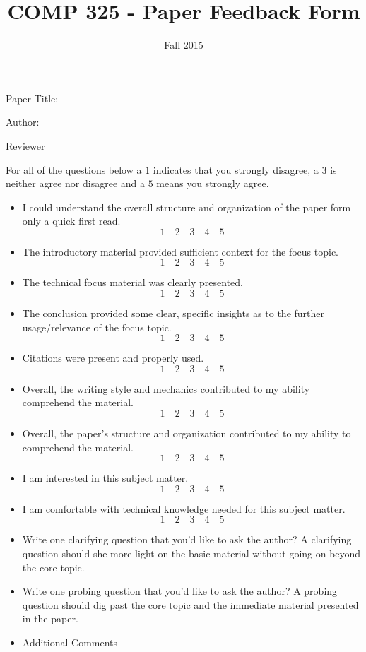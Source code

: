 \documentclass[10pt]{article}
\title{COMP 325 - Paper Feedback Form}
\author{  }
\date{Fall 2015}
\begin{document}
\maketitle 
\thispagestyle{empty}

Paper Title: \underline{\hspace{4in}}
\vspace{.2in}

Author:\underline{\hspace{4in}}
\vspace{.2in}

Reviewer\underline{\hspace{4in}}
\vspace{.1in}

For all of the questions below a $1$ indicates that you strongly disagree, a $3$ is neither agree nor disagree and a $5$ means you strongly agree.
\begin{itemize}
\item I could understand the overall structure and organization of the paper form only a quick first read.
\[ 1 \quad 2 \quad 3 \quad 4 \quad 5\]
\item The introductory material provided sufficient context for the focus topic.
\[ 1 \quad 2 \quad 3 \quad 4 \quad 5\]
\item The technical focus material was clearly presented.
\[ 1 \quad 2 \quad 3 \quad 4 \quad 5\]
\item The conclusion provided some clear, specific insights as to the further usage/relevance of the focus topic.
\[ 1 \quad 2 \quad 3 \quad 4 \quad 5\]
\item Citations were present and properly used.
\[ 1 \quad 2 \quad 3 \quad 4 \quad 5\]
\item Overall, the writing style and mechanics contributed to my ability comprehend the material.
\[ 1 \quad 2 \quad 3 \quad 4 \quad 5\]
\item Overall, the paper's structure and organization contributed to my ability to comprehend the material.
\[ 1 \quad 2 \quad 3 \quad 4 \quad 5\]
\item I am interested in this subject matter.
\[ 1 \quad 2 \quad 3 \quad 4 \quad 5\]
\item I am comfortable with technical knowledge needed for this subject matter.
\[ 1 \quad 2 \quad 3 \quad 4 \quad 5\]
\newpage \thispagestyle{empty}

\item Write one clarifying question that you'd like to ask the author? A clarifying question should she more light on the basic material without going on beyond the core topic.
\vspace{2in}
\item Write one probing question that you'd like to ask the author?  A probing question should dig past the core topic and the immediate material presented in the paper.
\vspace{2in}
\item Additional Comments
\end{itemize}
\end{document}
